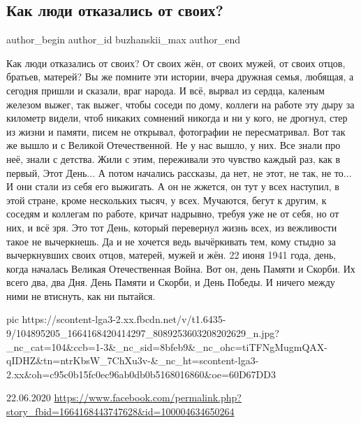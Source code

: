  
 
 
 
 
 
\subsection{Как люди отказались от своих?}
\label{sec:22_06_2021.fb.buzhanskii_max.1.kak_ludi_otkazalis_ot_svoih}
\ifcmt
 author_begin
   author_id buzhanskii_max
 author_end
\fi

\obeycr
Как люди отказались от своих?
От своих жён, от своих мужей, от своих отцов, братьев, матерей?
Вы же помните эти истории, вчера дружная семья, любящая, а сегодня пришли и сказали, враг народа.
И всё, вырвал из сердца, каленым железом выжег, так выжег, чтобы соседи по дому, коллеги на работе эту дыру за километр видели, чтоб никаких сомнений никогда и ни у кого, не дрогнул, стер из жизни и памяти, писем не открывал, фотографии не пересматривал.
Вот так же вышло и с Великой Отечественной.
Не у нас вышло, у них.
Все знали про неё, знали с детства.
Жили с этим, переживали это чувство каждый раз, как в первый, Этот День...
А потом начались рассказы, да нет, не этот, не так, не то...
И они стали из себя его выжигать.
А он не жжется, он тут у всех наступил, в этой стране, кроме нескольких тысяч, у всех.
Мучаются, бегут к другим, к соседям и коллегам по работе, кричат надрывно, требуя уже не от себя, но от них, и всё зря.
Это тот День, который перевернул жизнь всех, из вежливости такое не вычеркнешь.
Да и не хочется ведь вычёркивать тем, кому стыдно за вычеркнувших своих отцов, матерей, мужей и жён.
22 июня 1941 года, день, когда началась Великая Отечественная Война.
Вот он, день Памяти и Скорби.
Их всего два, два Дня.
День Памяти и Скорби, и День Победы.
И ничего между ними не втиснуть, как ни пытайся.
\restorecr

\ifcmt
  pic https://scontent-lga3-2.xx.fbcdn.net/v/t1.6435-9/104895205_1664168420414297_8089253603208202629_n.jpg?_nc_cat=104&ccb=1-3&_nc_sid=8bfeb9&_nc_ohc=tiTFNgMugmQAX-qIDHZ&tn=ntrKbsW_7ChXu3v-&_nc_ht=scontent-lga3-2.xx&oh=c95c0b15fc0ec96ab0db0b5168016860&oe=60D67DD3
\fi

22.06.2020
\url{https://www.facebook.com/permalink.php?story_fbid=1664168443747628&id=100004634650264}
